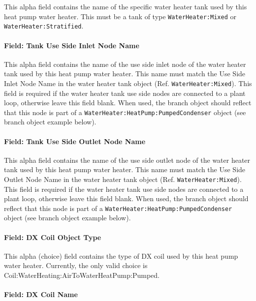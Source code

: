 This alpha field contains the name of the specific water heater tank used by this heat pump water heater. This must be a tank of type \lstinline!WaterHeater:Mixed! or \lstinline!WaterHeater:Stratified!.

\paragraph{Field: Tank Use Side Inlet Node Name}\label{field-tank-use-side-inlet-node-name}

This alpha field contains the name of the use side inlet node of the water heater tank used by this heat pump water heater. This name must match the Use Side Inlet Node Name in the water heater tank object (Ref. \lstinline!WaterHeater:Mixed!). This field is required if the water heater tank use side nodes are connected to a plant loop, otherwise leave this field blank. When used, the branch object should reflect that this node is part of a \lstinline!WaterHeater:HeatPump:PumpedCondenser! object (see branch object example below).

\paragraph{Field: Tank Use Side Outlet Node Name}\label{field-tank-use-side-outlet-node-name}

This alpha field contains the name of the use side outlet node of the water heater tank used by this heat pump water heater. This name must match the Use Side Outlet Node Name in the water heater tank object (Ref. \lstinline!WaterHeater:Mixed!). This field is required if the water heater tank use side nodes are connected to a plant loop, otherwise leave this field blank. When used, the branch object should reflect that this node is part of a \lstinline!WaterHeater:HeatPump:PumpedCondenser! object (see branch object example below).

\paragraph{Field: DX Coil Object Type}\label{field-dx-coil-object-type}

This alpha (choice) field contains the type of DX coil used by this heat pump water heater. Currently, the only valid choice is Coil:WaterHeating:AirToWaterHeatPump:Pumped.

\paragraph{Field: DX Coil Name}\label{field-dx-coil-name}

